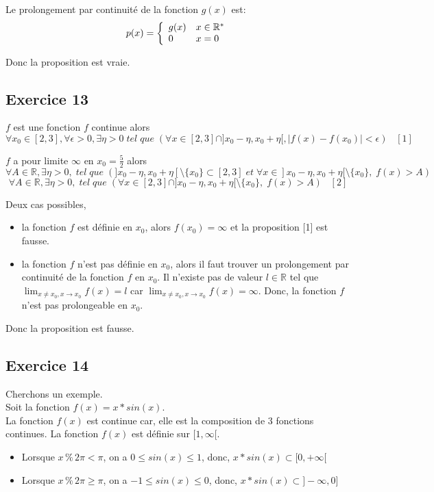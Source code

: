 \documentclass[]{book}
\theoremstyle{definition}
\newcommand{\bb}[1]{\mathbb{#1}}
\newcommand{\R}{\bb{R}}
\begin{document}
Le prolongement par continuit\'e de la fonction $g(x)$ est: 
$$p(x) = 
\left\{ 
\begin{array}{l l}
 g(x) & x \in \R^{*}\\
 0 & x = 0\\
\end{array}
\right. 
$$

Donc la proposition est vraie.


\subsection*{Exercice 13}
$f$ est une fonction $f$ continue alors 
$$\forall x_0 \in [2,3], \forall \epsilon >0, \exists \eta > 0\; tel\; que\; (\forall x \in [2,3] \cap ]x_0-\eta, x_0+\eta[, |f(x)-f(x_0)| < \epsilon) \;\;\; [1]$$ 

$f$ a pour limite $\infty$ en $x_0=\frac{5}{2}$ alors
$$\forall A \in \R, \exists \eta > 0,\; tel\; que\; (]x_0-\eta, x_0+\eta[ \setminus \{x_0\} \subset [2,3] \; et \; \forall x \in ]x_0-\eta, x_0+\eta[ \setminus \{x_0\},\; f(x) > A)$$
$$\forall A \in \R, \exists \eta > 0,\; tel\; que\; (\forall x \in [2,3] \cap ]x_0-\eta, x_0+\eta[ \setminus \{x_0\}, \; f(x) > A) \;\;\; [2]$$

Deux cas possibles, 
\begin{itemize}
\item la fonction $f$ est d\'efinie en $x_0$, alors $f(x_0) = \infty$ et la proposition [1] est fausse.
\item la fonction $f$ n'est pas d\'efinie en $x_0$, alors il faut trouver un prolongement par continuit\'e de la fonction $f$ en $x_0$. Il n'existe pas de valeur $l \in \R$ tel que $\lim_{x \neq x_0, x \to x_0} f(x) = l$ car $\lim_{x \neq x_0, x \to x_0} f(x) = \infty$. Donc,  la fonction $f$ n'est pas prolongeable en $x_0$.
\end{itemize}


Donc la proposition est fausse.


\subsection*{Exercice 14}
Cherchons un exemple.\\
Soit la fonction $f(x) = x*sin(x)$.\\
La fonction $f(x)$ est continue car, elle est la composition de 3 fonctions continues. La fonction $f(x)$ est d\'efinie sur $[1,\infty[$.

\begin{itemize}
\item  Lorsque $x\, \% \, 2\pi < \pi$, on a $0 \le sin(x) \le 1$, donc, $x*sin(x) \subset [0,+\infty[$
\item  Lorsque $x\, \% \, 2\pi \ge \pi$, on a $-1 \le sin(x) \le 0$, donc, $x*sin(x) \subset ]-\infty,0]$
\end{itemize}
\end{document}
